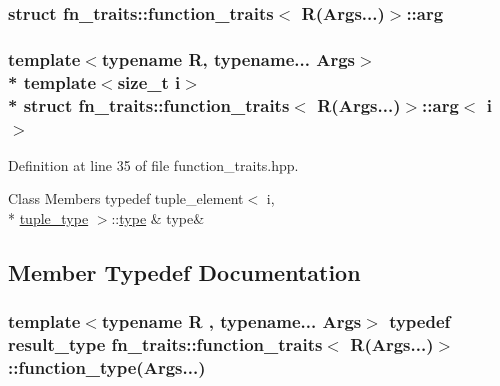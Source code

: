 \subsubsection{struct fn\+\_\+traits\+:\+:function\+\_\+traits$<$ R(Args...)$>$\+:\+:arg}
\subsubsection*{template$<$typename R, typename... Args$>$\\*
template$<$size\+\_\+t i$>$\\*
struct fn\+\_\+traits\+::function\+\_\+traits$<$ R(\+Args...)$>$\+::arg$<$ i $>$}



Definition at line 35 of file function\+\_\+traits.\+hpp.

\begin{DoxyFields}{Class Members}
typedef tuple\+\_\+element$<$ i, \\*
\hyperlink{structfn__traits_1_1function__traits_3_01_r_07_args_8_8_8_08_4_a9b60ae8c79e52addf352e4ae7c8077b4}{tuple\+\_\+type} $>$\+::\hyperlink{structfn__traits_1_1function__traits_3_01_r_07_args_8_8_8_08_4_ac0fde1bea9167cdc37a22b37bea78eb3}{type}\hypertarget{structfn__traits_1_1function__traits_3_01_r_07_args_8_8_8_08_4_ac0fde1bea9167cdc37a22b37bea78eb3}{}\label{structfn__traits_1_1function__traits_3_01_r_07_args_8_8_8_08_4_ac0fde1bea9167cdc37a22b37bea78eb3}
&
type&
\\
\hline

\end{DoxyFields}


\subsection{Member Typedef Documentation}
\subsubsection[{\texorpdfstring{function\+\_\+type}{function_type}}]{\setlength{\rightskip}{0pt plus 5cm}template$<$typename R , typename... Args$>$ typedef {\bf result\+\_\+type} {\bf fn\+\_\+traits\+::function\+\_\+traits}$<$ R(Args...)$>$\+::function\+\_\+type(Args...)}\hypertarget{structfn__traits_1_1function__traits_3_01_r_07_args_8_8_8_08_4_a85e5883a1c8050fe442c1072386b2d11}{}\label{structfn__traits_1_1function__traits_3_01_r_07_args_8_8_8_08_4_a85e5883a1c8050fe442c1072386b2d11}


